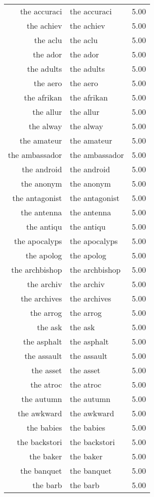 \begin{table}[ht]
\begin{tabular}{rlr}
  the accuraci & the accuraci & 5.00 \\ 
  the achiev & the achiev & 5.00 \\ 
  the aclu & the aclu & 5.00 \\ 
  the ador & the ador & 5.00 \\ 
  the adults & the adults & 5.00 \\ 
  the aero & the aero & 5.00 \\ 
  the afrikan & the afrikan & 5.00 \\ 
  the allur & the allur & 5.00 \\ 
  the alway & the alway & 5.00 \\ 
  the amateur & the amateur & 5.00 \\ 
  the ambassador & the ambassador & 5.00 \\ 
  the android & the android & 5.00 \\ 
  the anonym & the anonym & 5.00 \\ 
  the antagonist & the antagonist & 5.00 \\ 
  the antenna & the antenna & 5.00 \\ 
  the antiqu & the antiqu & 5.00 \\ 
  the apocalyps & the apocalyps & 5.00 \\ 
  the apolog & the apolog & 5.00 \\ 
  the archbishop & the archbishop & 5.00 \\ 
  the archiv & the archiv & 5.00 \\ 
  the archives & the archives & 5.00 \\ 
  the arrog & the arrog & 5.00 \\ 
  the ask & the ask & 5.00 \\ 
  the asphalt & the asphalt & 5.00 \\ 
  the assault & the assault & 5.00 \\ 
  the asset & the asset & 5.00 \\ 
  the atroc & the atroc & 5.00 \\ 
  the autumn & the autumn & 5.00 \\ 
  the awkward & the awkward & 5.00 \\ 
  the babies & the babies & 5.00 \\ 
  the backstori & the backstori & 5.00 \\ 
  the baker & the baker & 5.00 \\ 
  the banquet & the banquet & 5.00 \\ 
  the barb & the barb & 5.00 \\ 

\end{tabular}
\end{table}
